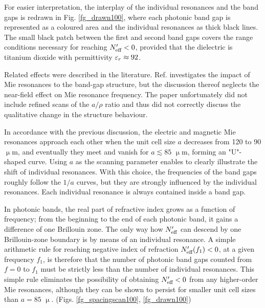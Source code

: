 For easier interpretation, the interplay of the individual resonances and the band gaps is redrawn in Fig. \ref{fg_drawn100}, where each photonic band gap is represented as a coloured area and the individual resonances as thick black lines. The small black patch between the first and second band gaps covers the range conditions necessary for reaching $N_{\text{eff} }'<0$, provided that the dielectric is titanium dioxide with permittivity $\varepsilon_r \approx 92$. 

Related effects were described in the literature. Ref. \cite{shi2007} investigates the impact of Mie resonances to the band-gap structure, but the discussion thereof neglects the near-field effect on Mie resonance frequency. The paper unfortunately did not include refined scans of the $a/\rho$ ratio and thus did not correctly discuss the qualitative change in the structure behaviour. 

In accordance with the previous discussion, the electric and magnetic Mie resonances approach each other when the unit cell size $a$ decreases from 120 to 90 $\upmu$m, and eventually they meet and vanish for $a \lesssim 85$ $\upmu$m, forming an "U"-shaped curve. Using $a$ as the scanning parameter enables to clearly illustrate the shift of individual resonances. With this choice, the frequencies of the band gaps roughly follow the $1/a$ curves, but they are strongly influenced by the individual resonances. Each individual resonance is always contained inside a band gap.

In photonic bands, the real part of refractive index grows as a function of frequency; from the beginning to the end of each photonic band, it gains a difference of one Brillouin zone. The only way how $N_{\text{eff} }'$ can descend by one Brillouin-zone boundary is by means of an individual resonance. A simple arithmetic rule for reaching negative index of refraction $N_{\text{eff} }'(f_1)<0$, at a given frequency $f_1$, is therefore that the number of photonic band gaps counted from $f=0$ to $f_1$ must be strictly less than the number of individual resonances. 
This simple rule eliminates the possibility of obtaining $N_{\text{eff} }'<0$ from any higher-order Mie resonances, although they can be shown to persist for smaller unit cell sizes than $a=85$ $\upmu$.  (Figs. \ref{fg_spacingscan100}, \ref{fg_drawn100})

